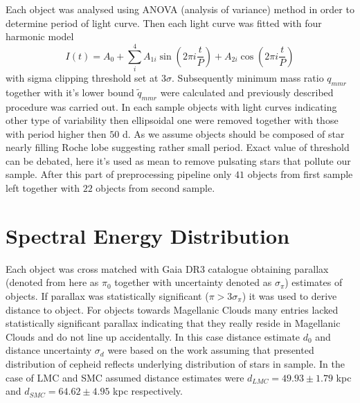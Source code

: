\documentclass{pracalicmgr}
\begin{document}
Each object was analysed using ANOVA (analysis of variance) method \citep{schwarzenberg-czerny_advantage_1989} in order to determine period of light curve.
Then each light curve was fitted with four harmonic model
\begin{equation}\label{harm}
    I(t)=A_0+\sum_i^4 A_{1i}\sin{\left(2\pi i\frac{t}{P}\right)}+A_{2i}\cos{\left(2\pi i\frac{t}{P}\right)}
\end{equation}
with sigma clipping threshold set at $3\sigma$. Subsequently minimum mass ratio $q_{mmr}$ together with it's lower bound $\tilde{q}_{mmr}$ were calculated and previously described procedure was carried out.
In each sample objects with light curves indicating other type of variability then ellipsoidal one were removed together with those with period higher then
$50$ d. As we assume objects should be composed of star nearly filling Roche lobe suggesting rather small period. Exact value of threshold can be debated, here it's used as mean to 
remove pulsating stars that pollute our sample. After this part of preprocessing pipeline only $41$ objects from first sample left together with $22$ objects from second sample.
\section{Spectral Energy Distribution}
Each object was cross matched  with Gaia DR3 catalogue obtaining parallax (denoted from here as $\pi_0$ together with uncertainty denoted as $\sigma_{\pi}$) estimates of objects. If parallax was statistically significant ($\pi>3\sigma_{\pi}$)
it was used to derive distance to object. For objects towards Magellanic Clouds many entries lacked statistically significant parallax indicating that they really reside in Magellanic Clouds
and do not line up accidentally.
In this case distance estimate $d_0$ and distance uncertainty $\sigma_d$ were based on the work \citep{jacyszyn-dobrzeniecka_ogle-ing_2016} assuming that presented distribution 
of cepheid reflects underlying distribution of stars in sample.
In the case of LMC and SMC assumed distance estimates were  $d_{LMC}=49.93\pm1.79$ kpc and  $d_{SMC}=64.62\pm4.95$ kpc respectively. 
\end{document}
